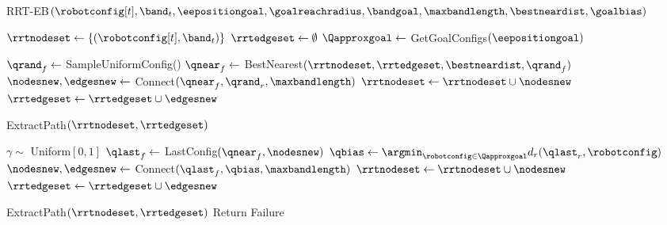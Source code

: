 \begin{algorithm}[t]
\caption{RRT-EB$(\robotconfig[t], \band_t, \eepositiongoal, \goalreachradius, \bandgoal, \maxbandlength, \bestneardist, \goalbias)$}
\begin{algorithmic}[1]
    \State $\rrtnodeset \gets \{(\robotconfig[t], \band_t)\}$
    \State $\rrtedgeset \gets \emptyset$
    \State $\Qapproxgoal \gets$ GetGoalConfigs$(\eepositiongoal)$
    
            \State $\qrand_f \gets$ SampleUniformConfig() \label{alg:bandrrt:basic_start}
            \State $\qnear_f \gets$ BestNearest$(\rrtnodeset, \rrtedgeset, \bestneardist, \qrand_f)$
            \State $\nodesnew, \edgesnew \gets$ Connect$(\qnear_f, \qrand_r, \maxbandlength)$
            \State $\rrtnodeset \gets \rrtnodeset \cup \nodesnew$
            \State $\rrtedgeset \gets \rrtedgeset \cup \edgesnew$
            
                \State \Return ExtractPath$(\rrtnodeset, \rrtedgeset)$
            \EndIf \label{alg:bandrrt:basic_end}
            
            \State $\gamma \sim$ Uniform$[0, 1]$ \label{alg:bandrrt:bias_start}
            \If {$\gamma \leq \goalbias$}
                \State $\qlast_f \gets$ LastConfig$(\qnear_f, \nodesnew)$ \label{alg:bandrrt:lastconfig}
                \State $\qbias \gets \argmin_{\robotconfig \in \Qapproxgoal} d_r(\qlast_r, \robotconfig)$
                \State $\nodesnew, \edgesnew \gets$ Connect$(\qlast_f, \qbias, \maxbandlength)$
            \State $\rrtnodeset \gets \rrtnodeset \cup \nodesnew$
            \State $\rrtedgeset \gets \rrtedgeset \cup \edgesnew$
                
                    \State \Return ExtractPath$(\rrtnodeset, \rrtedgeset)$
                \EndIf
            \EndIf \label{alg:bandrrt:bias_end}
    \EndWhile
    \State Return Failure
\end{algorithmic}
\label{alg:bandrrt}
\end{algorithm}

